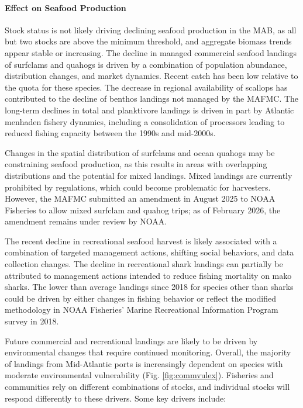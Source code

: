 \documentclass[
  10pt,
]{article}
\begin{document}
\paragraph{Effect on Seafood Production}\label{effect-on-seafood-production}

Stock status is not likely driving declining seafood production in the MAB, as all but two stocks are above the minimum threshold, and aggregate biomass trends appear stable or increasing. The decline in managed commercial seafood landings of surfclams and quahogs is driven by a combination of population abundance, distribution changes, and market dynamics. Recent catch has been low relative to the quota for these species. The decrease in regional availability of scallops has contributed to the decline of benthos landings not managed by the MAFMC. The long-term declines in total and planktivore landings is driven in part by Atlantic menhaden fishery dynamics, including a consolidation of processors leading to reduced fishing capacity between the 1990s and mid-2000s.

Changes in the spatial distribution of surfclams and ocean quahogs may be constraining seafood production, as this results in areas with overlapping distributions and the potential for mixed landings. Mixed landings are currently prohibited by regulations, which could become problematic for harvesters. However, the MAFMC submitted an amendment in August 2025 to NOAA Fisheries to allow mixed surfclam and quahog trips; as of February 2026, the amendment remains under review by NOAA.

The recent decline in recreational seafood harvest is likely associated with a combination of targeted management actions, shifting social behaviors, and data collection changes. The decline in recreational shark landings can partially be attributed to management actions intended to reduce fishing mortality on mako sharks. The lower than average landings since 2018 for species other than sharks could be driven by either changes in fishing behavior or reflect the modified methodology in NOAA Fisheries' Marine Recreational Information Program survey in 2018.

Future commercial and recreational landings are likely to be driven by environmental changes that require continued monitoring. Overall, the majority of landings from Mid-Atlantic ports is increasingly dependent on species with moderate environmental vulnerability (Fig. \ref{fig:commvulex}). Fisheries and communities rely on different combinations of stocks, and individual stocks will respond differently to these drivers. Some key drivers include:
\end{document}
